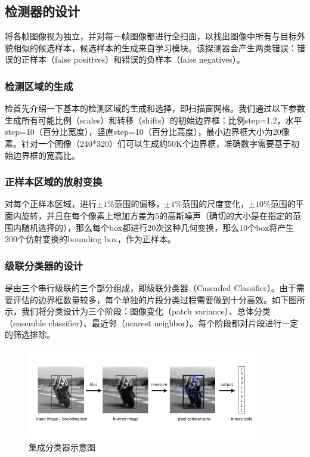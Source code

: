 \subsection{检测器的设计}
将各帧图像视为独立，并对每一帧图像都进行全扫面，以找出图像中所有与目标外貌相似的候选样本，候选样本的生成来自学习模块。该探测器会产生两类错误：错误的正样本（false positives）和错误的负样本（false negatives）。

\subsubsection{检测区域的生成}
检首先介绍一下基本的检测区域的生成和选择，即扫描窗网格。我们通过以下参数生成所有可能比例（scales）和转移（shifts）的初始边界框：比例step=1.2，水平step=10（百分比宽度），竖直step=10（百分比高度），最小边界框大小为20像素。针对一个图像（240*320）们可以生成约50K个边界框，准确数字需要基于初始边界框的宽高比。

\subsubsection{正样本区域的放射变换}
对每个正样本区域，进行$±1\%$范围的偏移，$±1\%$范围的尺度变化，$±10\%$范围的平面内旋转，并且在每个像素上增加方差为5的高斯噪声（确切的大小是在指定的范围内随机选择的），那么每个box都进行20次这种几何变换，那么10个box将产生200个仿射变换的bounding box，作为正样本。

\subsubsection{级联分类器的设计}
是由三个串行级联的三个部分组成，即级联分类器（Cascaded Classifier）。由于需要评估的边界框数量较多，每个单独的片段分类过程需要做到十分高效。如下图所示，我们将分类设计为三个阶段：图像变化（patch variance）、总体分类（ensemble classifier）、最近邻（nearest neighbor）。每个阶段都对片段进行一定的筛选排除。
\begin{figure}[htb]   
	\centering
	\includegraphics[width=\textwidth]{figs/161002_Thesis_Tracking_Section_04.pdf}
	\caption{集成分类器示意图}
	\label{fig:161002_Thesis_Tracking_Section_04}
\end{figure}

